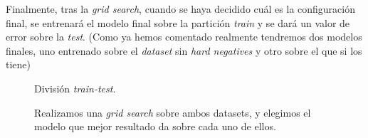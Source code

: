 Finalmente, tras la \textit{grid search}, cuando se haya decidido cuál es la configuración final, se entrenará el modelo final sobre la partición \textit{train} y se dará un valor de error sobre la \textit{test}. (Como ya hemos comentado realmente tendremos dos modelos finales, uno entrenado sobre el \textit{dataset} sin \textit{hard negatives} y otro sobre el que si los tiene)

\begin{figure}[H]
\centering
    \caption{División \textit{train-test}.} 
    \label{fig:train-test}
\end{figure}

\begin{figure}[H]
\centering
    \caption{Realizamos una \textit{grid search} sobre ambos datasets, y elegimos el modelo que mejor resultado da sobre cada uno de ellos.} 
\end{figure}